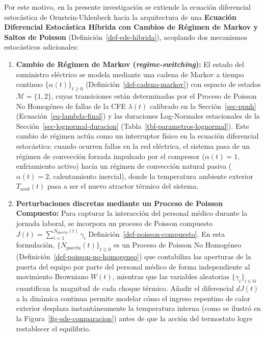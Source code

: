 \documentclass[
  spanish,
  us-letterpaper,
]{scrreprt}
\providecommand{\tightlist}{%
  \setlength{\itemsep}{0pt}\setlength{\parskip}{0pt}}
\numberwithin{equation}{section}
\theoremstyle{plain}
\theoremstyle{plain}
\theoremstyle{definition}
\theoremstyle{plain}
\theoremstyle{remark}
\begin{document}
Por este motivo, en la presente investigación se extiende la ecuación
diferencial estocástica de Ornstein-Uhlenbeck hacia la arquitectura de
una \textbf{Ecuación Diferencial Estocástica Híbrida con Cambios de
Régimen de Markov y Saltos de Poisson}
(Definición~\ref{def-ede-hibrida}), acoplando dos mecanismos
estocásticos adicionales:

\begin{enumerate}
\def\labelenumi{\arabic{enumi}.}
\tightlist
\item
  \textbf{Cambio de Régimen de Markov (\emph{regime-switching}):} El
  estado del suministro eléctrico se modela mediante una cadena de
  Markov a tiempo continuo \(\{\alpha(t)\}_{t \ge 0}\)
  (Definición~\ref{def-cadena-markov}) con espacio de estados
  \(\mathcal{M} = \{1, 2\}\), cuyas transiciones están determinadas por
  el Proceso de Poisson No Homogéneo de fallas de la CFE \(\lambda(t)\)
  calibrado en la Sección~\ref{sec-ppnh}
  (Ecuación~\ref{eq-lambda-final}) y las duraciones Log-Normales
  estacionales de la Sección~\ref{sec-lognormal-duracion}
  (Tabla~\ref{tbl-parametros-lognormal}). Este cambio de régimen actúa
  como un interruptor físico en la ecuación diferencial estocástica:
  cuando ocurren fallas en la red eléctrica, el sistema pasa de un
  régimen de convección forzada impulsado por el compresor
  (\(\alpha(t) = 1\), enfriamiento activo) hacia un régimen de
  convección natural pasiva (\(\alpha(t) = 2\), calentamiento inercial),
  donde la temperatura ambiente exterior \(T_{amb}(t)\) pasa a ser el
  nuevo atractor térmico del sistema.
\item
  \textbf{Perturbaciones discretas mediante un Proceso de Poisson
  Compuesto:} Para capturar la interacción del personal médico durante
  la jornada laboral, se incorpora un proceso de Poisson compuesto
  \(\displaystyle J(t) = \sum_{i=1}^{N_{puerta}(t)} \gamma_i\)
  Definición~\ref{def-poisson-compuesto}. En esta formulación,
  \(\{N_{puerta}(t)\}_{t \ge 0}\) es un Proceso de Poisson No Homogéneo
  (Definición~\ref{def-poisson-no-homogeneo}) que contabiliza las
  aperturas de la puerta del equipo por parte del personal médico de
  forma independiente al movimiento Browniano \(W(t)\), mientras que las
  variables aleatorias \(\{\gamma_i\}_{i \in \mathbb{N}}\) cuantifican
  la magnitud de cada choque térmico. Añadir el diferencial \(dJ(t)\) a
  la dinámica continua permite modelar cómo el ingreso repentino de
  calor exterior desplaza instantáneamente la temperatura interna (como
  se ilustró en la Figura~\ref{fig-sde-comparacion}) antes de que la
  acción del termostato logre restablecer el equilibrio.
\end{enumerate}
\end{document}
